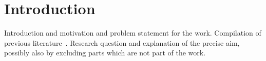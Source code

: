 \chapter{Introduction}\label{ch:1}
Introduction and motivation and problem statement for the work. Compilation of previous literature~\cite{lorenz1963deterministic}. Research question and explanation of the precise aim, possibly also by excluding parts which are not part of the work.